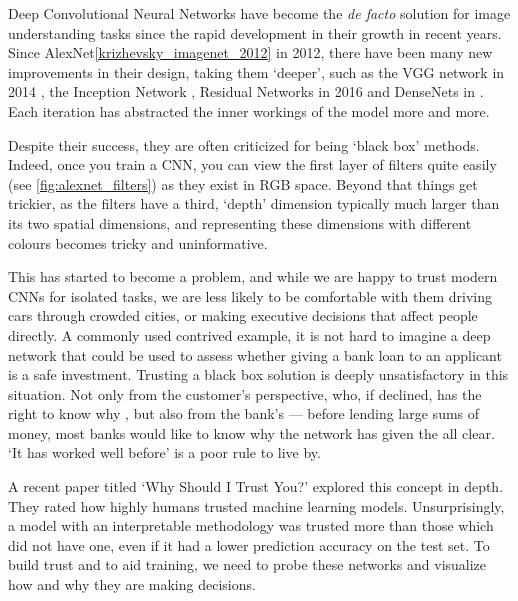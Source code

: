 Deep Convolutional Neural Networks have become the \emph{de facto} solution for
image understanding tasks since the rapid development in their growth in recent
years. Since AlexNet\autoref{krizhevsky_imagenet_2012} in 2012, there have been
many new improvements in their design, taking them `deeper', such as the
VGG network in 2014 \cite{simonyan_very_2014}, the Inception Network
\cite{szegedy_going_2015}, Residual Networks in 2016
\cite{he_deep_2016} and DenseNets in \cite{huang_densely_2017}. Each iteration
has abstracted the inner workings of the model more and more.

Despite their success, they are often criticized for being `black box'
methods. Indeed, once you train a CNN, you can view the first layer of filters
quite easily (see \autoref{fig:alexnet_filters}) as they exist in RGB
space. Beyond that things get trickier, as the filters have a third, `depth'
dimension typically much larger than its two spatial dimensions, and
representing these dimensions with different colours becomes tricky and
uninformative.

This has started to become a problem, and while we are happy to trust modern
CNNs for isolated tasks, we are less likely to be comfortable with them driving
cars through crowded cities, or making executive decisions that affect people
directly. A commonly used contrived example, it is not hard to imagine a deep
network that could be used to assess whether giving a bank loan to an applicant
is a safe investment. Trusting a black box solution is deeply unsatisfactory in
this situation. Not only from the customer's perspective, who, if declined, has
the right to know why \citep{goodman_european_2016}, but
also from the bank's --- before lending large sums of money, most banks
would like to know why the network has given the all clear. `It has worked well
before' is a poor rule to live by.

A recent paper titled `Why Should I Trust You?' \cite{ribeiro_why_2016}
explored this concept in depth. They rated how highly humans trusted machine
learning models. Unsurprisingly, a model with an interpretable methodology
was trusted more than those which did not have one, even if it had a lower
prediction accuracy on the test set. 
To build trust and to aid training, we need to probe these networks and
visualize how and why they are making decisions.

